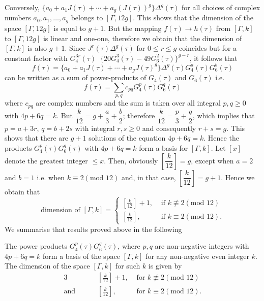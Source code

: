 Conversely, $\{a_0+a_1J(\tau) + \cdots + a_g(J(\tau))^g\}\Delta^g(\tau)$
for all choices of complex numbers $a_0,a_1,\ldots, a_g$ belongs to
$[\Gamma, 12g]$. This shows that the dimension of the space $[\Gamma,
  12g]$ is equal to $g+1$. But the mapping $f(\tau) \to h (\tau)$ from
$[\Gamma, k]$ to $[\Gamma, 12g]$ is linear and one-one, therefore we
obtain that the dimension of $[\Gamma, k]$ is also $g+1$. Since
$J^r(\tau)\Delta^g(\tau)$ for $0\leq r \leq g$ coincides but for a
constant factor with $G^{3r}_4(\tau) \;\; \{20 G^3_4 (\tau) - 49
G^2_6(\tau)\}^{g-r}$, it follows that
$$
f(\tau) = \{a_0+a_1 J(\tau)+ \cdots + a_g J(\tau)^g\} \Delta^g(\tau)
G^a_4(\tau) G^b_6(\tau)
$$
can be written as a sum of power-products of $G_4(\tau)$ and
$G_6(\tau)$ i.e.
$$
f(\tau) = \sum_{p,q} c_{pq} G^p_4(\tau) G^q_6(\tau)
$$
where $c_{pq}$ are complex numbers and the sum is taken over all
integral $p,q\geq 0$ with $4p+6q=k$. But
$\dfrac{k}{12}=g+\dfrac{a}{3}+\dfrac{b}{2}$; therefore
$\dfrac{k}{12}=\dfrac{p}{3} +\dfrac{q}{2}$, which implies that
$p=a+3r$, $q=b+2s$ with integral $r,s\geq 0$ and consequently
$r+s=g$. This shows that there are $g+1$ solutions of the equation
$4p+6q=k$. Hence the products $G^p_4(\tau) G^q_6(\tau)$ with $4p+6q=k$
form a basis for $[\Gamma,k]$. Let $[x]$ denote the greatest integer
$\leq x$. Then, obviously $\left[\dfrac{k}{12}\right]=g$, except when
$a=2$ and $b=1$ i.e. when $k\equiv 2(\text{mod } 12)$ and, in that case,
$\left[\dfrac{k}{12}\right]=g+1$. Hence we obtain that \pageoriginale
$$
\text{dimension of } [\Gamma, k] = 
\begin{cases}
\left[\frac{k}{12}\right] + 1, &\text{ if } k \not\equiv 2 (\text{mod } 12)\\[5pt]
\left[\frac{k}{12}\right], & \text{ if } k \equiv 2(\text{mod } 12).
\end{cases}
$$
We summarise that results proved above in the following 

\begin{thm}\label{chap2:thm14}
The power products $G^p_4(\tau)G^q_6(\tau)$, where $p,q$ are
non-negative integers with $4p+6q=k$ form a basis of the space
$[\Gamma, k]$ for any non-negative even integer $k$. The dimension of
the space $[\Gamma, k]$ for such $k$ is given by 
\begin{alignat*}{3}
& \left[\frac{k}{12}\right] + 1, &\text{ for } k \not\equiv 2 (\text{mod }
  12) \\[5pt]
\text{and } \qquad & \left[\frac{k}{12}\right], &\text{ for } k \equiv
2(\text{mod } 12). 
\end{alignat*}
\end{thm}

